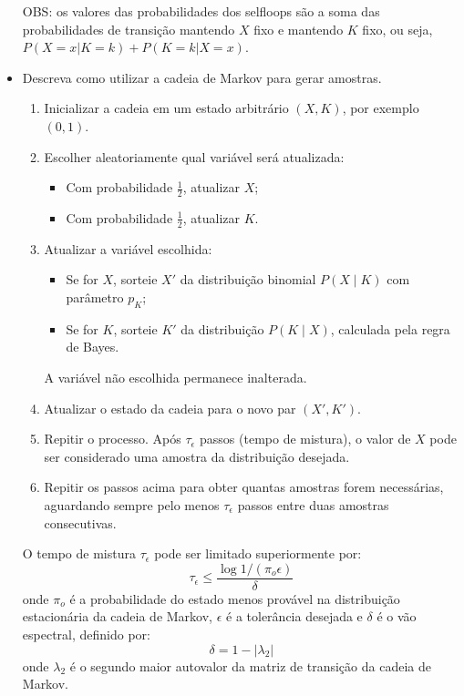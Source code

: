 \begin{itemize}
\begin{resposta}
\begin{center}
\begin{tikzpicture}[->, >=Stealth, node distance=3cm,
    every state/.style={circle, draw, minimum size=1.6cm},
    shorten >=1pt]
\end{tikzpicture}
\end{center}
OBS: os valores das probabilidades dos selfloops são a soma das probabilidades de transição mantendo $X$ fixo e mantendo $K$ fixo, ou seja, $P(X=x|K=k) + P(K=k|X=x)$.

  \end{resposta}
  \item Descreva como utilizar a cadeia de Markov para gerar amostras.
  \begin{resposta}

    \begin{enumerate}
  \item Inicializar a cadeia em um estado arbitrário $(X, K)$, por exemplo $(0, 1)$.
  
  \item Escolher aleatoriamente qual variável será atualizada:
  \begin{itemize}
    \item Com probabilidade $\frac{1}{2}$, atualizar $X$;
    \item Com probabilidade $\frac{1}{2}$, atualizar $K$.
  \end{itemize}

  \item Atualizar a variável escolhida:
  \begin{itemize}
    \item Se for $X$, sorteie $X'$ da distribuição binomial $P(X \mid K)$ com parâmetro $p_K$;
    \item Se for $K$, sorteie $K'$ da distribuição $P(K \mid X)$, calculada pela regra de Bayes.
  \end{itemize}
  A variável não escolhida permanece inalterada.

  \item Atualizar o estado da cadeia para o novo par $(X', K')$.

  \item Repitir o processo. Após $\tau_{\epsilon}$ passos (tempo de mistura), o valor de $X$ pode ser considerado uma amostra da distribuição desejada.

  \item Repitir os passos acima para obter quantas amostras forem necessárias, aguardando sempre pelo menos $\tau_{\epsilon}$ passos entre duas amostras consecutivas.
\end{enumerate}

O tempo de mistura $\tau_{\epsilon}$ pode ser limitado superiormente por:
$$ \tau_{\epsilon} \leq \frac{\log{1/(\pi_o \epsilon)}}{\delta}$$
onde $\pi_o$ é a probabilidade do estado menos provável na distribuição estacionária da cadeia de Markov, $\epsilon$ é a tolerância desejada e $\delta$ é o vão espectral, definido por:
$$ \delta = 1 - |\lambda_2|$$
onde $\lambda_2$ é o segundo maior autovalor da matriz de transição da cadeia de Markov.
  \end{resposta}
\end{itemize}

